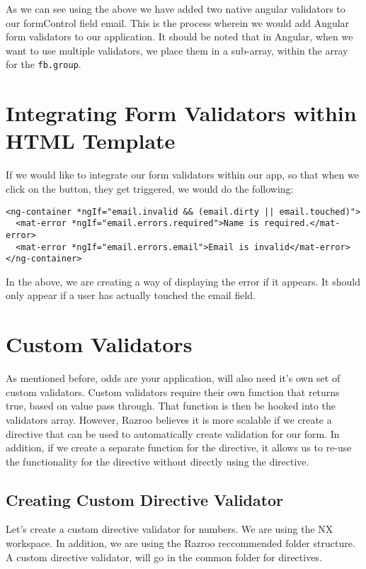 As we can see using the above we have added two native angular validators to
our formControl field email. This is the process wherein we would add Angular 
form validators to our application. It should be noted that in Angular, when 
we want to use multiple validators, we place them in a sub-array, within the 
array for the \lstinline{fb.group}.

\section{Integrating Form Validators within HTML Template}
If we would like to integrate our form validators within our app, so that when 
we click on the button, they get triggered, we would do the following:

\begin{lstlisting}[caption=Integrate Form Validation with HTML]
<ng-container *ngIf="email.invalid && (email.dirty || email.touched)">
  <mat-error *ngIf="email.errors.required">Name is required.</mat-error>
  <mat-error *ngIf="email.errors.email">Email is invalid</mat-error>
</ng-container>
\end{lstlisting}

In the above, we are creating a way of displaying the error if it appears. It 
should only appear if a user has actually touched the email field. 

\section{Custom Validators}
As mentioned before, odds are your application, will also need it's own set of
custom validators. Custom validators require their own function that returns 
true, based on value pass through. That function is then be hooked into 
the validators array. However, Razroo believes it is more scalable if we create
a directive that can be used to automatically create validation for our form. 
In addition, if we create a separate function for the directive, it allows us to
re-use the functionality for the directive without directly using the directive.

\subsection{Creating Custom Directive Validator}
Let's create a custom directive validator for numbers. We are using the NX 
workspace. In addition, we are using the Razroo reccommended folder structure. 
A custom directive validator, will go in the common folder for directives. 


